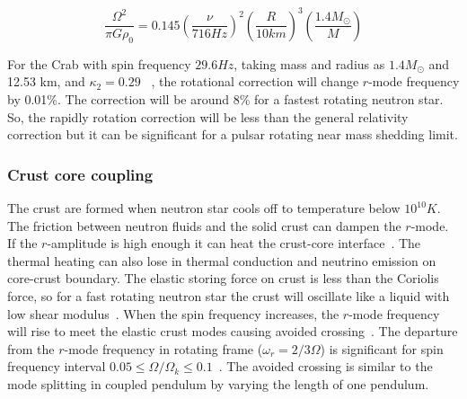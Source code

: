 \documentclass{ttuthes2007}
\begin{document}
\begin{equation}
\frac{\Omega^2}{\pi G \rho_0}=0.145 \left(\frac{\nu}{716 Hz}\right)^2
\left(\frac{R}{10km}\right)^3 \left(\frac{1.4M_\odot}{M}\right)
\end{equation}

For the Crab with spin frequency $29.6 Hz$, taking mass and radius as
$1.4M_\odot$ and 12.53 km, and $\kappa_2 = 0.29$~\cite{Lindblom_1999} , the
rotational correction  will change $r$-mode frequency by 0.01\%. The correction
will be around 8\% for a fastest rotating neutron star. So, the rapidly rotation
correction will be less than the general relativity correction but it can be
significant for a pulsar rotating near mass shedding limit.

\subsubsection{Crust core coupling}
The crust are formed when neutron star cools off to temperature below
$10^{10}K$.  The friction between neutron fluids and the solid crust can dampen
the $r$-mode.  If the $r$-amplitude is high enough it can heat the crust-core
interface~\cite{Lindblom_2000}. The thermal heating can also lose in thermal
conduction and neutrino emission on core-crust boundary. The elastic storing
force on crust is less than the Coriolis force, so for a fast rotating neutron
star the crust will oscillate like a liquid with low shear
modulus~\cite{Levin_2001}. When the spin frequency increases, the $r$-mode
frequency will rise to meet the elastic crust modes causing avoided
crossing~\cite{Levin_2001}. The departure from the $r$-mode frequency in rotating
frame ($\omega_r=2/3\Omega$) is significant for spin frequency interval
$0.05\leq\Omega/\Omega_k\leq0.1$~\cite{Idrisy_2015}. The avoided crossing is
similar to the mode splitting in coupled pendulum by varying the length of one
pendulum. 
\end{document}
